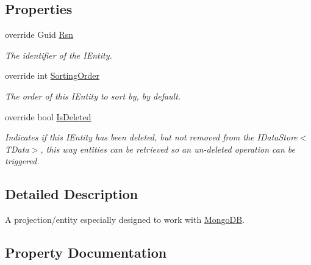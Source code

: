 \subsection*{Properties}
\begin{DoxyCompactItemize}
\item 
override Guid \hyperlink{classCqrs_1_1MongoDB_1_1Entities_1_1MongoEntity_acc0c0c4d927e9abfe88415cababff6b5_acc0c0c4d927e9abfe88415cababff6b5}{Rsn}
\begin{DoxyCompactList}\small\item\em The identifier of the I\+Entity. \end{DoxyCompactList}\item 
override int \hyperlink{classCqrs_1_1MongoDB_1_1Entities_1_1MongoEntity_a3d5f7476fc2de3b9061ea3e76e77e0cb_a3d5f7476fc2de3b9061ea3e76e77e0cb}{Sorting\+Order}
\begin{DoxyCompactList}\small\item\em The order of this I\+Entity to sort by, by default. \end{DoxyCompactList}\item 
override bool \hyperlink{classCqrs_1_1MongoDB_1_1Entities_1_1MongoEntity_a3e7a932f1333c34579fbb5ab9786d59d_a3e7a932f1333c34579fbb5ab9786d59d}{Is\+Deleted}
\begin{DoxyCompactList}\small\item\em Indicates if this I\+Entity has been deleted, but not removed from the I\+Data\+Store$<$\+T\+Data$>$, this way entities can be retrieved so an un-\/deleted operation can be triggered. \end{DoxyCompactList}\end{DoxyCompactItemize}


\subsection{Detailed Description}
A projection/entity especially designed to work with \hyperlink{namespaceCqrs_1_1MongoDB}{Mongo\+DB}. 



\subsection{Property Documentation}
\mbox{\label{classCqrs_1_1MongoDB_1_1Entities_1_1MongoEntity_a3e7a932f1333c34579fbb5ab9786d59d_a3e7a932f1333c34579fbb5ab9786d59d}} 
